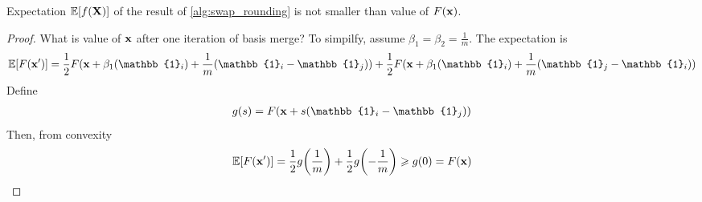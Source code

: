 \begin{theorem}
	Expectation $\mathbb{E}[f(\vb{X})]$ of the result of  \vref{alg:swap_rounding} is not smaller than value of $F(\vb{x})$.
	
	\begin{proof}
		What is value of $\vb{x}$ after one iteration of basis merge? To simpilfy, assume $\beta_1=\beta_2=\frac{1}{m}$. The expectation is
		\begin{align}
			\mathbb{E} [F(\vb{x}')] = \frac{1}{2} F(\vb{x} + \beta_1\qty(\mathbb{1}_i)+ \frac{1}{m}\qty(\mathbb{1}_i-\mathbb{1}_j))+\frac{1}{2} F(\vb{x} + \beta_1\qty(\mathbb{1}_i)+ \frac{1}{m}\qty(\mathbb{1}_j-\mathbb{1}_i))
		\end{align}
		Define
		\begin{align}
		g(s) = F\qty(\vb{x}+s\qty(\mathbb{1}_i-\mathbb{1}_j))
		\end{align}
		Then, from convexity
		\begin{align}
		\mathbb{E} [F(\vb{x}')] = \frac{1}{2}g\qty(\frac{1}{m})+\frac{1}{2}g\qty(-\frac{1}{m}) \geqslant g(0) = F(\vb{x})
		\end{align}
	\end{proof}
\end{theorem}


